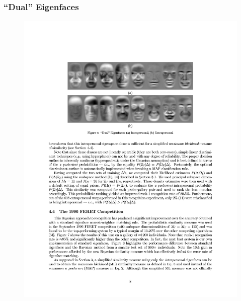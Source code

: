 \documentclass{beamer}
\begin{document}
\begin{frame}
\frametitle{``Dual'' Eigenfaces}
\begin{figure}[H]
\centering
\includegraphics[width=\textwidth, trim=1.6in 6.4in 1.6in 1.6in, clip]{Moghaddam10}
\end{figure}
\end{frame}
\end{document}
